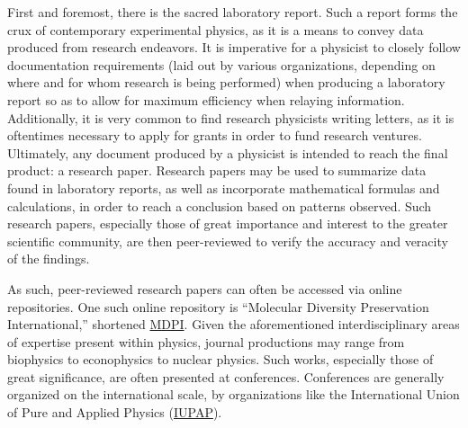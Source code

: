 \begin{justify}
  \hspace{.5in} First and foremost, there is the sacred laboratory report. Such a report forms the crux of contemporary experimental physics, as it is a means to convey data produced from research endeavors. It is imperative for a physicist to closely follow documentation requirements (laid out by various organizations, depending on where and for whom research is being performed) when producing a laboratory report so as to allow for maximum efficiency when relaying information. Additionally, it is very common to find research physicists writing letters, as it is oftentimes necessary to apply for grants in order to fund research ventures. Ultimately, any document produced by a physicist is intended to reach the final product: a research paper. Research papers may be used to summarize data found in laboratory reports, as well as incorporate mathematical formulas and calculations, in order to reach a conclusion based on patterns observed. Such research papers, especially those of great importance and interest to the greater scientific community, are then peer-reviewed to verify the accuracy and veracity of the findings.

  \hspace{.5in} As such, peer-reviewed research papers can often be accessed via online repositories. One such online repository is ``Molecular Diversity Preservation International,'' shortened \href{https://www.mdpi.com/}{MDPI}. Given the aforementioned interdisciplinary areas of expertise present within physics, journal productions may range from biophysics to econophysics to nuclear physics. Such works, especially those of great significance, are often presented at conferences. Conferences are generally organized on the international scale, by organizations like the International Union of Pure and Applied Physics (\href{https://iupap.org/}{IUPAP}).


\end{justify}
